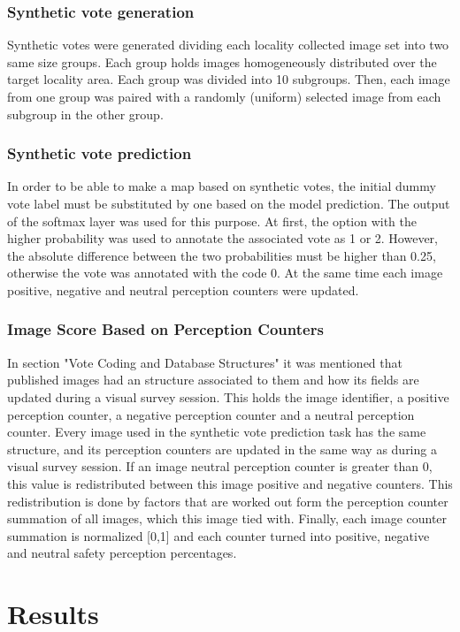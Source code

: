 \documentclass{llncs}
\begin{document}
\subsubsection{Synthetic vote generation}
Synthetic votes were generated dividing each locality collected image set into two same size groups. Each group holds images homogeneously distributed over the target locality area. Each group was divided into 10 subgroups. Then, each image from one group was paired with a randomly (uniform) selected image from each subgroup in the other group.

\subsubsection{Synthetic vote prediction}
In order to be able to make a map based on synthetic votes, the initial dummy vote label must be substituted by one based on the model prediction. The output of the softmax layer was used for this purpose. At first, the option with the higher probability was used to annotate the associated vote as 1 or 2. However, the absolute difference between the two probabilities must be higher than 0.25, otherwise the vote was annotated with the code 0. At the same time each image positive, negative and neutral perception counters were updated.

\subsubsection{Image Score Based on Perception Counters}
In section "Vote Coding and Database Structures" it was mentioned that published images had an structure associated to them and how its fields are updated during a visual survey session. This holds the image identifier, a positive perception counter, a negative perception counter and a neutral perception counter. Every image used in the synthetic vote prediction task has the same structure, and its perception counters are updated in the same way as during a visual survey session. If an image neutral perception counter is greater than 0, this value is redistributed between this image positive and negative counters. This redistribution is done by factors that are worked out form the perception counter summation of all images, which this image tied with. Finally, each image counter summation is normalized [0,1] and each counter turned into positive, negative and neutral safety perception percentages.

\section{Results}
\end{document}
